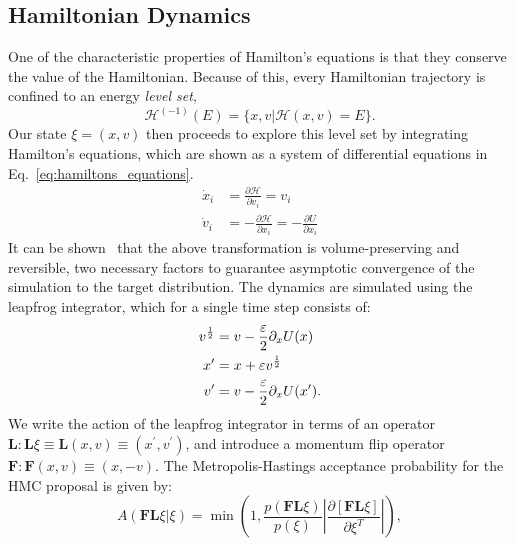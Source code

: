 \documentclass[../main.tex]{subfiles}
\begin{document}
\subsection{Hamiltonian Dynamics}
%
One of the characteristic properties of Hamilton's equations is that they conserve the value of the Hamiltonian.
%
Because of this, every Hamiltonian trajectory is confined to an energy \emph{level set},
%
\begin{equation}
  \mathcal{H}^{(-1)}(E) = \{x, v | \mathcal{H}(x, v) = E\}.
\end{equation}
%
Our state $\xi = (x, v)$ then proceeds to explore this level set by integrating Hamilton's equations, which are shown
as a system of differential equations in Eq.~\ref{eq:hamiltons_equations}.
%
%
\begin{align}
    \dot x_i &= \frac{\partial \mathcal{H}}{\partial v_i} = v_i\\
    \dot v_i &= -\frac{\partial \mathcal{H}}{\partial x_i} = - \frac{\partial
        U}{\partial x_i}
\label{eq:hamiltons_equations}
\end{align}
%
It can be shown~\cite{2012arXiv1206.1901N} that the above transformation is volume-preserving and reversible, two
necessary factors to guarantee asymptotic convergence of the simulation to the target distribution.
%
The dynamics are simulated using the leapfrog integrator, which for a single time step consists of:
%
\begin{align}
    v^{\frac{1}{2}} &= v - \frac{{\varepsilon}}{2} \partial_x U(x)\\
    x^{\prime} &= x + {\varepsilon} v^{\frac{1}{2}}\\
    v^{\prime} &= v - \frac{{\varepsilon}}{2} \partial_x U(x^{\prime}).
    \label{eq:generic_leapfrog}
\end{align}
%
We write the action of the leapfrog integrator in terms of an operator $\mathbf{L}: \mathbf{L}\xi \equiv \mathbf{L}(x,
v) \equiv (x^{\prime}, v^{\prime})$, and introduce a momentum flip operator $\mathbf{F}: \mathbf{F}(x, v) \equiv (x,
-v)$.
%
The Metropolis-Hastings acceptance probability for the HMC proposal is given by:
%
\begin{equation}
    A(\mathbf{F}\mathbf{L} \xi | \xi) = \min\left(1,
        \frac{p(\mathbf{F}\mathbf{L}\xi)}{p(\xi)}\left|
        \frac{\partial\left[\mathbf{F}\mathbf{L}\xi\right]}
        {\partial\xi^{T}}\right|\right),
\label{eq:metropolis_hastings}
\end{equation}
\end{document}
